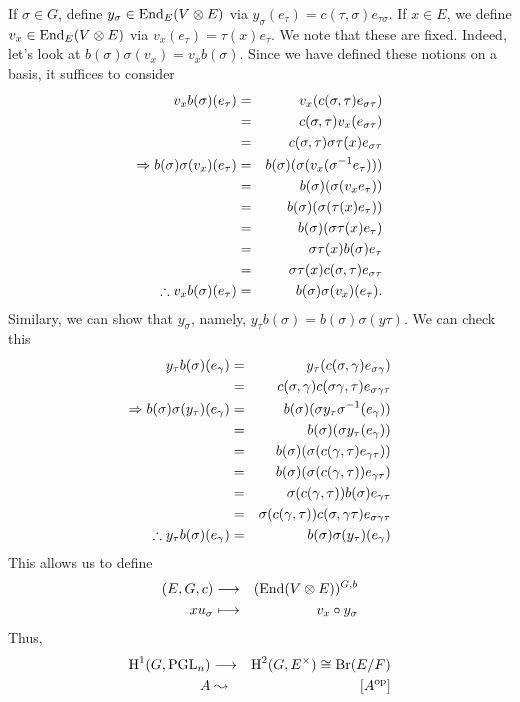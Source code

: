If $\sigma \in G$, define $y_{\sigma} \in \operatorname{End}_E(V\otimes E)$ via $y_{\sigma}(e_{\tau}) = c(\tau , \sigma)e_{\tau \sigma}$. If $x \in E$, we define $v_x \in \operatorname{End}_E(V\otimes E)$ via $v_x(e_{\tau}) = \tau(x)e_{\tau}$. We note that these are fixed. Indeed, let's look at 
$b(\sigma)\sigma (v_x) = v_x b(\sigma)$. Since we have defined these notions on a basis, it suffices to consider
\begin{eqnarray*}
v_xb(\sigma)(e_{\tau}) & = & v_x(c(\sigma , \tau)e_{\sigma\tau}) \\ & =  & c(\sigma,\tau)v_x(e_{\sigma\tau}) \\ & = & c(\sigma , \tau)\sigma \tau (x) e_{\sigma \tau} \\ \Rightarrow b(\sigma)\sigma (v_x)(e_{\tau}) & = & b(\sigma)(\sigma (v_x(\sigma^{-1} e_{\tau}))) \\
& = & b(\sigma)(\sigma (v_x e_{\tau})) \\& = & b(\sigma)(\sigma (\tau (x)e_{\tau})) \\ & = & b(\sigma)(\sigma \tau (x)e_{\tau}) \\& = & \sigma \tau (x)b(\sigma)e_{\tau} \\ & = & \sigma \tau (x) c(\sigma ,\tau)e_{\sigma \tau} \\ \therefore v_xb(\sigma)(e_{\tau}) & = & b(\sigma)\sigma (v_x)(e_{\tau}) .  
\end{eqnarray*}
Similary, we can show that $y_{\sigma}$, namely, $y_{\tau}b(\sigma) = b(\sigma)\sigma(y\tau)$. We can check this
\begin{eqnarray*}
y_{\tau}b(\sigma)(e_{\gamma}) & = & y_{\tau}(c(\sigma , \gamma)e_{\sigma \gamma}) \\
& = & c(\sigma , \gamma)c(\sigma \gamma , \tau)e_{\sigma\gamma\tau} \\
\Rightarrow b(\sigma)\sigma (y_{\tau})(e_{\gamma}) & = & b(\sigma)(\sigma y_{\tau}\sigma ^{-1} (e_{\gamma})) \\
& = & b(\sigma) (\sigma y_{\tau}(e_{\gamma})) \\ & = & b(\sigma) (\sigma (c(\gamma , \tau)e_{\gamma\tau})) \\
& = & b(\sigma )(\sigma (c(\gamma , \tau))e_{\gamma \tau}) \\
& = & \sigma (c(\gamma , \tau))b(\sigma)e_{\gamma \tau} \\ & = & \sigma (c(\gamma , \tau))c(\sigma , \gamma\tau)e_{\sigma \gamma \tau} \\
\therefore y_{\tau}b(\sigma)(e_{\gamma}) & = & b(\sigma)\sigma (y_{\tau})(e_{\gamma})
\end{eqnarray*}
This allows us to define 
\begin{eqnarray*}
(E,G,c) & \longrightarrow & (\operatorname{End} (V\otimes E))^{G,b} \\
xu_{\sigma} & \longmapsto & v_{x}\circ y_{\sigma}
\end{eqnarray*}
Thus, 
\begin{eqnarray*}
\text{H}^1(G,\operatorname{PGL}_n) &\longrightarrow & \text{H}^2(G,E^{\times}) \cong \operatorname{Br} (E/F) \\
A & \leadsto & [A^{\operatorname{op}}]
\end{eqnarray*}
